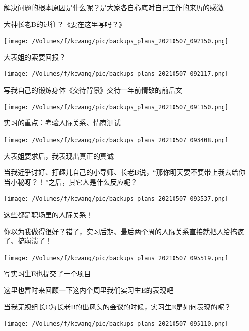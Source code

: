 \documentclass[9pt, b5paper]{article}
\begin{document}
解决问题的根本原因是什么呢？是大家各自心底对自己工作的来历的感激

大神长老B的过往？《要在这里写吗？》

\begin{center}
\texttt{[image: /Volumes/f/kcwang/pic/backups\_plans\_20210507\_092150.png]}
\end{center}

大表姐的索要回报？


\begin{center}
\texttt{[image: /Volumes/f/kcwang/pic/backups\_plans\_20210507\_092117.png]}
\end{center}

写我自己的锻炼身体《交待背景》交待十年前情敌的前后文

\begin{center}
\texttt{[image: /Volumes/f/kcwang/pic/backups\_plans\_20210507\_091150.png]}
\end{center}

实习的重点：考验人际关系、情商测试

\begin{center}
\texttt{[image: /Volumes/f/kcwang/pic/backups\_plans\_20210507\_093408.png]}
\end{center}

大表姐要求后，我表现出真正的真诚

当我近乎讨好、打趣儿自己的小导师、长老B说，“那你明天要不要带上我去给你当小秘呀？！”之后，其它人是什么反应呢？

\begin{center}
\texttt{[image: /Volumes/f/kcwang/pic/backups\_plans\_20210507\_093537.png]}
\end{center}

这些都是职场里的人际关系！

你以为我做得很好？错了，实习后期、最后两个周的人际关系直接就把人给搞疯了、搞崩溃了！

\begin{center}
\texttt{[image: /Volumes/f/kcwang/pic/backups\_plans\_20210507\_095519.png]}
\end{center}

写实习生E也提交了一个项目 

这里也暂时来回顾一下这内个周里我们实习生E的表现吧

当我无视组长C为长老B的出风头的会议的时候，实习生E是如何表现的呢？

\begin{center}
\texttt{[image: /Volumes/f/kcwang/pic/backups\_plans\_20210507\_095110.png]}
\end{center}
\end{document}
